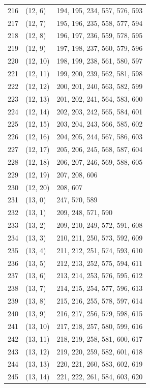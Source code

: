 \documentclass{article}
\begin{document}
\begin{longtable}{lll}
  216 & (12, 6) & 194, 195, 234, 557, 576, 593 \\
  217 & (12, 7) & 195, 196, 235, 558, 577, 594 \\
  218 & (12, 8) & 196, 197, 236, 559, 578, 595 \\
  219 & (12, 9) & 197, 198, 237, 560, 579, 596 \\
  220 & (12, 10) & 198, 199, 238, 561, 580, 597 \\
  221 & (12, 11) & 199, 200, 239, 562, 581, 598 \\
  222 & (12, 12) & 200, 201, 240, 563, 582, 599 \\
  223 & (12, 13) & 201, 202, 241, 564, 583, 600 \\
  224 & (12, 14) & 202, 203, 242, 565, 584, 601 \\
  225 & (12, 15) & 203, 204, 243, 566, 585, 602 \\
  226 & (12, 16) & 204, 205, 244, 567, 586, 603 \\
  227 & (12, 17) & 205, 206, 245, 568, 587, 604 \\
  228 & (12, 18) & 206, 207, 246, 569, 588, 605 \\
  229 & (12, 19) & 207, 208, 606 \\
  230 & (12, 20) & 208, 607 \\
  231 & (13, 0) & 247, 570, 589 \\
  232 & (13, 1) & 209, 248, 571, 590 \\
  233 & (13, 2) & 209, 210, 249, 572, 591, 608 \\
  234 & (13, 3) & 210, 211, 250, 573, 592, 609 \\
  235 & (13, 4) & 211, 212, 251, 574, 593, 610 \\
  236 & (13, 5) & 212, 213, 252, 575, 594, 611 \\
  237 & (13, 6) & 213, 214, 253, 576, 595, 612 \\
  238 & (13, 7) & 214, 215, 254, 577, 596, 613 \\
  239 & (13, 8) & 215, 216, 255, 578, 597, 614 \\
  240 & (13, 9) & 216, 217, 256, 579, 598, 615 \\
  241 & (13, 10) & 217, 218, 257, 580, 599, 616 \\
  242 & (13, 11) & 218, 219, 258, 581, 600, 617 \\
  243 & (13, 12) & 219, 220, 259, 582, 601, 618 \\
  244 & (13, 13) & 220, 221, 260, 583, 602, 619 \\
  245 & (13, 14) & 221, 222, 261, 584, 603, 620 \\

\end{longtable}
\end{document}
